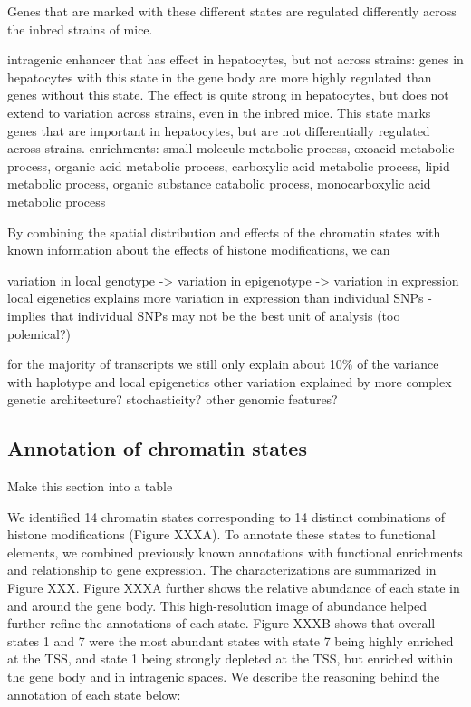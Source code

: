 \documentclass[10pt,letterpaper]{article}
\begin{document}
Genes that are marked with these different states are regulated
differently across the inbred strains of mice.

intragenic enhancer that has effect in hepatocytes, but not across
strains: genes in hepatocytes with this state in the gene body are more
highly regulated than genes without this state. The effect is quite
strong in hepatocytes, but does not extend to variation across strains,
even in the inbred mice. This state marks genes that are important in
hepatocytes, but are not differentially regulated across strains.
enrichments: small molecule metabolic process, oxoacid metabolic
process, organic acid metabolic process, carboxylic acid metabolic
process, lipid metabolic process, organic substance catabolic process,
monocarboxylic acid metabolic process

By combining the spatial distribution and effects of the chromatin
states with known information about the effects of histone
modifications, we can

variation in local genotype -\textgreater{} variation in epigenotype
-\textgreater{} variation in expression local eigenetics explains more
variation in expression than individual SNPs - implies that individual
SNPs may not be the best unit of analysis (too polemical?)

for the majority of transcripts we still only explain about 10\% of the
variance with haplotype and local epigenetics other variation explained
by more complex genetic architecture? stochasticity? other genomic
features?

\hypertarget{annotation-of-chromatin-states}{%
\subsection{Annotation of chromatin
states}\label{annotation-of-chromatin-states}}

Make this section into a table

We identified 14 chromatin states corresponding to 14 distinct
combinations of histone modifications (Figure XXXA). To annotate these
states to functional elements, we combined previously known annotations
with functional enrichments and relationship to gene expression. The
characterizations are summarized in Figure XXX. Figure XXXA further
shows the relative abundance of each state in and around the gene body.
This high-resolution image of abundance helped further refine the
annotations of each state. Figure XXXB shows that overall states 1 and 7
were the most abundant states with state 7 being highly enriched at the
TSS, and state 1 being strongly depleted at the TSS, but enriched within
the gene body and in intragenic spaces. We describe the reasoning behind
the annotation of each state below:
\end{document}
